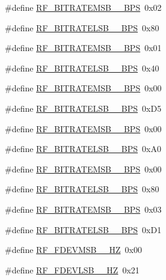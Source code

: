\begin{DoxyCompactItemize}
\item 
\#define \hyperlink{sx1276Regs-Fsk_8h_a7b42c7402e7d73f2e75d753085badf7a}{R\+F\+\_\+\+B\+I\+T\+R\+A\+T\+E\+M\+S\+B\+\_\+\_\+\+B\+PS}~0x02
\item 
\#define \hyperlink{sx1276Regs-Fsk_8h_a1780bbfac40913821e859a35c0a7eae2}{R\+F\+\_\+\+B\+I\+T\+R\+A\+T\+E\+L\+S\+B\+\_\+\_\+\+B\+PS}~0x80
\item 
\#define \hyperlink{sx1276Regs-Fsk_8h_a899b8e6397e082b4d95f589ba51093b0}{R\+F\+\_\+\+B\+I\+T\+R\+A\+T\+E\+M\+S\+B\+\_\+\_\+\+B\+PS}~0x01
\item 
\#define \hyperlink{sx1276Regs-Fsk_8h_ac8a775e0079f97d0da847bcbc743f8b8}{R\+F\+\_\+\+B\+I\+T\+R\+A\+T\+E\+L\+S\+B\+\_\+\_\+\+B\+PS}~0x40
\item 
\#define \hyperlink{sx1276Regs-Fsk_8h_adb3227e86cec303479803ee36c94dc12}{R\+F\+\_\+\+B\+I\+T\+R\+A\+T\+E\+M\+S\+B\+\_\+\_\+\+B\+PS}~0x00
\item 
\#define \hyperlink{sx1276Regs-Fsk_8h_a4c354668226a9b7cbc899d1571eb7f6a}{R\+F\+\_\+\+B\+I\+T\+R\+A\+T\+E\+L\+S\+B\+\_\+\_\+\+B\+PS}~0x\+D5
\item 
\#define \hyperlink{sx1276Regs-Fsk_8h_a2820d9407f3f886ccc4b95f37bdba43a}{R\+F\+\_\+\+B\+I\+T\+R\+A\+T\+E\+M\+S\+B\+\_\+\_\+\+B\+PS}~0x00
\item 
\#define \hyperlink{sx1276Regs-Fsk_8h_a5dc775df5325cee5e4f068777ec7d0ce}{R\+F\+\_\+\+B\+I\+T\+R\+A\+T\+E\+L\+S\+B\+\_\+\_\+\+B\+PS}~0x\+A0
\item 
\#define \hyperlink{sx1276Regs-Fsk_8h_a2929fca60be7a159f4f0b3768f60d811}{R\+F\+\_\+\+B\+I\+T\+R\+A\+T\+E\+M\+S\+B\+\_\+\_\+\+B\+PS}~0x00
\item 
\#define \hyperlink{sx1276Regs-Fsk_8h_a39ce2c4b4f89ca91ee4a9a943341a75f}{R\+F\+\_\+\+B\+I\+T\+R\+A\+T\+E\+L\+S\+B\+\_\+\_\+\+B\+PS}~0x80
\item 
\#define \hyperlink{sx1276Regs-Fsk_8h_a7110c5c5081018aa2856943a0cf1223c}{R\+F\+\_\+\+B\+I\+T\+R\+A\+T\+E\+M\+S\+B\+\_\+\_\+\+B\+PS}~0x03
\item 
\#define \hyperlink{sx1276Regs-Fsk_8h_a358a84803ccf3e4c4896cdbd43576c08}{R\+F\+\_\+\+B\+I\+T\+R\+A\+T\+E\+L\+S\+B\+\_\+\_\+\+B\+PS}~0x\+D1
\item 
\#define \hyperlink{sx1276Regs-Fsk_8h_a5f494883fb5d77b75be547962cc3bc55}{R\+F\+\_\+\+F\+D\+E\+V\+M\+S\+B\+\_\+\_\+\+HZ}~0x00
\item 
\#define \hyperlink{sx1276Regs-Fsk_8h_acf567929b56d3921b2d717142b29275b}{R\+F\+\_\+\+F\+D\+E\+V\+L\+S\+B\+\_\+\_\+\+HZ}~0x21

\end{DoxyCompactItemize}
